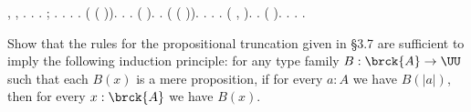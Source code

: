 \begin{coqdoccode}
\coqdocindent{1.00em}
\coqdocnotation{(}\coqdockw{\ensuremath{\forall}} , \coqdocnotation{\ensuremath{\lnot}} \coqdocnotation{\ensuremath{\lnot}}  \coqdocnotation{)} \coqdocnotation{\ensuremath{\eqvsym}} \coqdocnotation{\ensuremath{\lnot}} \coqdocnotation{\ensuremath{\lnot}} \coqdocnotation{(}\coqdockw{\ensuremath{\forall}} ,  \coqdocnotation{)}.\coqdoceol
\coqdocnoindent
{}.\coqdoceol
\coqdocindent{1.00em}
 .  ;  .\coqdoceol
\coqdocemptyline
\coqdocindent{1.00em}
 .  .  .\coqdoceol
\coqdocindent{1.00em}
 ( ( )).\coqdoceol
\coqdocindent{2.00em}
 .  .\coqdoceol
\coqdocindent{2.00em}
 ( ).\coqdoceol
\coqdocemptyline
\coqdocindent{1.00em}
 .\coqdoceol
\coqdocindent{1.00em}
 ( ( )).\coqdoceol
\coqdocindent{2.00em}
 .  . .\coqdoceol
\coqdocindent{2.00em}
 (\coqdocnotation{\ensuremath{\lnot}} \coqdocnotation{(}\coqdockw{\ensuremath{\forall}} ,  \coqdocnotation{)}).  .  ( ).\coqdoceol
\coqdocindent{2.00em}
 .\coqdoceol
\coqdocnoindent
{}.\coqdoceol
\coqdocemptyline
\coqdocnoindent
{} .\coqdoceol
\coqdocemptyline
\end{coqdoccode}
Show that the rules for the propositional truncation given in \S3.7 are
sufficient to imply the following induction principle: for any type family $B :
\brck{A} \to \UU$ such that each $B(x)$ is a mere proposition, if for every
$a:A$ we have $B(\lvert a \rvert)$, then for every $x : \brck{A}$ we have
$B(x)$.


